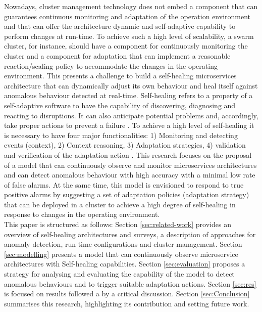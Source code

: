 \documentclass[sigconf]{acmart}
\begin{document}
Nowadays, cluster management technology does not embed a component that can guarantees continuous monitoring and adaptation of the operation environment and that can offer the architecture dynamic and self-adaptive capability to perform  changes at run-time.  To achieve such a high level of scalability, a swarm cluster, for instance, should have a component for continuously monitoring the cluster and a component for adaptation that can implement a reasonable reaction/scaling policy to accommodate the changes in the operating environment. This presents a challenge to build a self-healing microservices architecture that can dynamically adjust its own behaviour and heal itself against anomalous behaviour detected at real-time. Self-healing refers to a property of a self-adaptive software to have the capability of discovering, diagnosing and reacting to disruptions. It can also anticipate potential problems and, accordingly, take proper actions to prevent a failure \cite{Salehie:2009p3693}. To achieve a high level of  self-healing it is necessary to have four major functionalities: 1)  Monitoring and detecting events (context), 2) Context reasoning, 3) Adaptation strategies, 4) validation and verification of the adaptation action \cite{Kapitsaki:2009p3694}.  
This research focuses on the proposal of a model that can continuously observe and monitor microservices architectures and can detect anomalous behaviour with high accuracy with a minimal low rate of false alarms. At the same time, this model is envisioned to respond to true positive alarms by suggesting a set of adaptation policies (adaptation strategy) that can be deployed in a cluster to achieve a high degree of self-healing in response to changes in the operating environment.\\

This paper is structured as follows: Section \ref{sec:related-work} provides an overview of self-healing architectures and surveys, a description of approaches for  anomaly detection, run-time configurations and cluster management. Section \ref{sec:modelling} presents a model that can continuously observe microservice architectures with Self-healing capabilities. Section \ref{sec:evaluation} proposes a strategy for analysing and evaluating the capability of the model  to detect anomalous behaviours and to trigger suitable adaptation actions. Section \ref{sec:res} is focused on results followed a by a critical discussion. Section \ref{sec:Conclusion} summarises this research, highlighting its contribution and setting future work.
\end{document}
